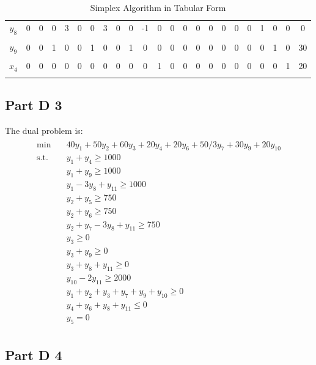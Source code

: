 \documentclass[fleqn,10pt]{wlscirep}
\begin{document}
\begin{table}
{\begin{tabular}{ccccccccccccccccccccccc}
            \\[-1em]
            $y_{8}$ & 0 & 0 & 0 & 3 & 0 & 0 & 3 & 0 & 0 & -1 & 0 & 0 & 0 & 0 & 0 & 0 & 0 & 0 & 1 & 0 & 0 & 0 \\
            \\[-1em]
            $y_{9}$ & 0 & 0 & 1 & 0 & 0 & 1 & 0 & 0 & 1 & 0 & 0 & 0 & 0 & 0 & 0 & 0 & 0 & 0 & 0 & 1 & 0 & 30 \\
            \\[-1em]
            $x_{4}$ & 0 & 0 & 0 & 0 & 0 & 0 & 0 & 0 & 0 & 0 & 1 & 0 & 0 & 0 & 0 & 0 & 0 & 0 & 0 & 0 & 1 & 20 \\
            \\[-1em]
            \hline
        \end{tabular}
    }
    \caption{Simplex Algorithm in Tabular Form}
    \label{tab-sa2}
\end{table}
\FloatBarrier

\subsection{Part D 3}

The dual problem is:
\begin{align} \begin{split}
    \min \quad & 40 y_{1} + 50 y_{2} + 60 y_{3} + 20 y_{4} + 20 y_{6} + 50 / 3 y_{7} + 30 y_{9} + 20 y_{10} \\
    \text{s.t.} \quad 
    & y_{1} + y_{4} \geq 1000 \\
    & y_{1} + y_{9} \geq 1000 \\
    & y_{1} - 3 y_{8} + y_{11} \geq 1000 \\
    & y_{2} + y_{5} \geq 750 \\
    & y_{2} + y_{6} \geq 750 \\
    & y_{2} + y_{7} - 3 y_{8} + y_{11} \geq 750 \\
    & y_{3} \geq 0 \\
    & y_{3} + y_{9} \geq 0 \\
    & y_{3} + y_{8} + y_{11} \geq 0 \\
    & y_{10} - 2 y_{11} \geq 2000 \\
    & y_{1} + y_{2} + y_{3} + y_{7} + y_{9} + y_{10} \geq 0 \\
    & y_{4} + y_{6} + y_{8} + y_{11} \leq 0 \\
    & y_{5} = 0
\end{split} \end{align} 

\subsection{Part D 4}
\end{document}
